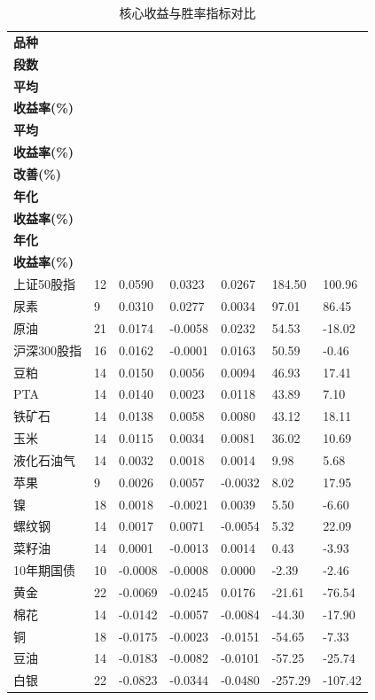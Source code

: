 \begin{table}[!htbp]
\centering
\caption{核心收益与胜率指标对比}
\label{tab:core_compare}
\footnotesize
\setlength{\tabcolsep}{2pt}
\renewcommand{\arraystretch}{1.18}
\begin{tabular}{@{}p{}p{}p{}p{}p{}p{}p{}@{}}
\toprule
\textbf{品种} &
\makecell{\textbf{时间}\\\textbf{段数}} &
\makecell{\textbf{孪生对抗}\\\textbf{平均}\\\textbf{收益率(\%)}} &
\makecell{\textbf{基准模型}\\\textbf{平均}\\\textbf{收益率(\%)}} &
\makecell{\textbf{收益率}\\\textbf{改善(\%)}} &
\makecell{\textbf{孪生对抗}\\\textbf{年化}\\\textbf{收益率(\%)}} &
\makecell{\textbf{基准模型}\\\textbf{年化}\\\textbf{收益率(\%)}} \\
\midrule
上证50股指 & 12 & 0.0590 & 0.0323 & 0.0267 & 184.50 & 100.96 \\
尿素 & 9 & 0.0310 & 0.0277 & 0.0034 & 97.01 & 86.45 \\
原油 & 21 & 0.0174 & -0.0058 & 0.0232 & 54.53 & -18.02 \\
沪深300股指 & 16 & 0.0162 & -0.0001 & 0.0163 & 50.59 & -0.46 \\
豆粕 & 14 & 0.0150 & 0.0056 & 0.0094 & 46.93 & 17.41 \\
PTA & 14 & 0.0140 & 0.0023 & 0.0118 & 43.89 & 7.10 \\
铁矿石 & 14 & 0.0138 & 0.0058 & 0.0080 & 43.12 & 18.11 \\
玉米 & 14 & 0.0115 & 0.0034 & 0.0081 & 36.02 & 10.69 \\
液化石油气 & 14 & 0.0032 & 0.0018 & 0.0014 & 9.98 & 5.68 \\
苹果 & 9 & 0.0026 & 0.0057 & -0.0032 & 8.02 & 17.95 \\
镍 & 18 & 0.0018 & -0.0021 & 0.0039 & 5.50 & -6.60 \\
螺纹钢 & 14 & 0.0017 & 0.0071 & -0.0054 & 5.32 & 22.09 \\
菜籽油 & 14 & 0.0001 & -0.0013 & 0.0014 & 0.43 & -3.93 \\
10年期国债 & 10 & -0.0008 & -0.0008 & 0.0000 & -2.39 & -2.46 \\
黄金 & 22 & -0.0069 & -0.0245 & 0.0176 & -21.61 & -76.54 \\
棉花 & 14 & -0.0142 & -0.0057 & -0.0084 & -44.30 & -17.90 \\
铜 & 18 & -0.0175 & -0.0023 & -0.0151 & -54.65 & -7.33 \\
豆油 & 14 & -0.0183 & -0.0082 & -0.0101 & -57.25 & -25.74 \\
白银 & 22 & -0.0823 & -0.0344 & -0.0480 & -257.29 & -107.42 \\
\bottomrule
\end{tabular}
\end{table}
